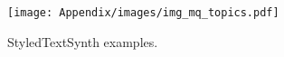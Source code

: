 \begin{figure}
    \centering
    \texttt{[image: Appendix/images/img\_mq\_topics.pdf]}
    \caption{StyledTextSynth examples.}
    \label{fig:mq_topics}
\end{figure}